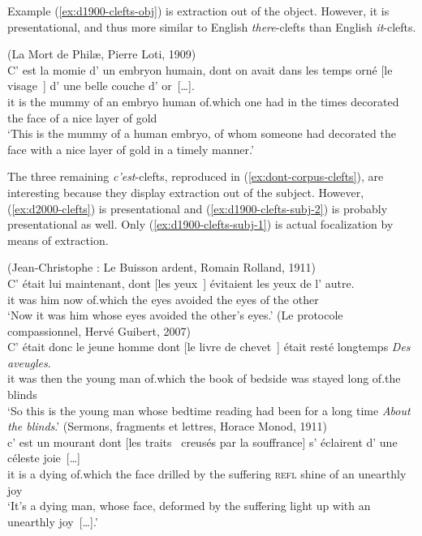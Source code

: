 Example (\ref{ex:d1900-clefts-obj}) is extraction out of the object. However, it is presentational, and thus more similar to English \emph{there}-clefts than English \emph{it}-clefts.

\ea (La Mort de Philæ, Pierre Loti, 1909)\nopagebreak\\
\gll C' est la momie d' un embryon humain, dont on avait dans les temps orné [le visage~\trace{}] d' une belle couche d' or~[\dots].\\
it is the mummy of an embryo human of.which one had in the times decorated the face of a nice layer of gold\\
\glt `This is the mummy of a human embryo, of whom someone had decorated the face with a nice layer of gold in a timely manner.'
\label{ex:d1900-clefts-obj}
\z 

The three remaining \emph{c'est}-clefts, reproduced in (\ref{ex:dont-corpus-clefts}), are interesting because they display extraction out of the subject. However, (\ref{ex:d2000-clefts}) is presentational and (\ref{ex:d1900-clefts-subj-2}) is probably presentational as well. Only (\ref{ex:d1900-clefts-subj-1}) is actual focalization by means of extraction. 

\eal \label{ex:dont-corpus-clefts}
\ex(Jean-Christophe : Le Buisson ardent, Romain Rolland, 1911)\\
\gll C' était lui maintenant, dont [les yeux~\trace{}] évitaient les yeux de l' autre.\\
it was him now of.which the eyes avoided the eyes of the other\\
\glt `Now it was him whose eyes avoided the other's eyes.'
\label{ex:d1900-clefts-subj-1}
\ex(Le protocole compassionnel, Hervé Guibert, 2007)\\
\gll C' était donc le jeune homme dont [le livre de chevet~\trace{}] était resté longtemps \emph{Des} \emph{aveugles}.\\
it was then the young man of.which the book of bedside was stayed long of.the blinds\\
\glt `So this is the young man whose bedtime reading had been for a long time \emph{About the blinds}.'
\label{ex:d2000-clefts}
\ex(Sermons, fragments et lettres, Horace Monod, 1911)\\
\gll [\dots] c' est un mourant dont [les traits~\trace{} creusés par la souffrance] s' éclairent d' une céleste joie~[\dots]\\
{} it is a dying of.which the face drilled by the suffering \textsc{refl} shine of an unearthly joy\\
\glt `It's a dying man, whose face, deformed by the suffering light up with an unearthly joy~[\dots].'
\label{ex:d1900-clefts-subj-2}
\zl 

